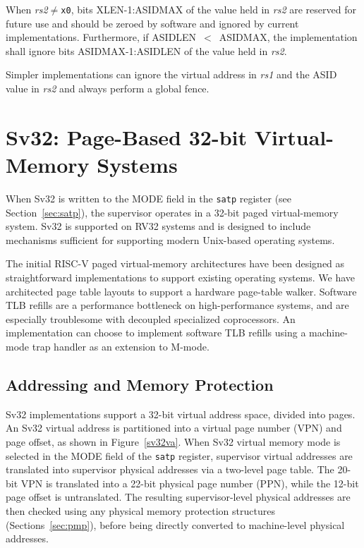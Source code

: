 When {\em rs2}$\neq${\tt x0}, bits XLEN-1:ASIDMAX of the value held in {\em
rs2} are reserved for future use and should be zeroed by software and ignored
by current implementations.  Furthermore, if ASIDLEN~$<$~ASIDMAX, the
implementation shall ignore bits ASIDMAX-1:ASIDLEN of the value held in {\em
rs2}.

\begin{commentary}
Simpler implementations can ignore the virtual address in {\em rs1} and
the ASID value in {\em rs2} and always perform a global fence.
\end{commentary}

\section{Sv32: Page-Based 32-bit Virtual-Memory Systems}
\label{sec:sv32}

When Sv32 is written to the MODE field in the {\tt satp} register
(see Section~\ref{sec:satp}),
the supervisor operates in a 32-bit paged virtual-memory system.  Sv32
is supported on RV32 systems and is designed to include mechanisms
sufficient for supporting modern Unix-based operating systems.

\begin{commentary}
The initial RISC-V paged virtual-memory architectures have been
designed as straightforward implementations to support existing
operating systems.  We have architected page table layouts to support
a hardware page-table walker.  Software TLB refills are a performance
bottleneck on high-performance systems, and are especially troublesome
with decoupled specialized coprocessors.  An implementation can choose
to implement software TLB refills using a machine-mode trap handler as
an extension to M-mode.
\end{commentary}

\subsection{Addressing and Memory Protection}
\label{sec:translation}

Sv32 implementations support a 32-bit virtual address space, divided
into  pages.  An Sv32 virtual address is partitioned
into a virtual page number (VPN) and page offset, as shown in
Figure~\ref{sv32va}.  When Sv32 virtual memory mode is selected in the
MODE field of the {\tt satp} register, supervisor virtual addresses
are translated into supervisor physical addresses via a two-level page
table.  The 20-bit VPN is translated into a 22-bit physical page
number (PPN), while the 12-bit page offset is untranslated.  The
resulting supervisor-level physical addresses are then checked using
any physical memory protection structures (Sections~\ref{sec:pmp}),
before being directly converted to machine-level physical addresses.

